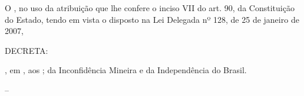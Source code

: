 \documentclass[a4paper,11pt]{report} %
\begin{document}


O \CargoSignatario, no uso da atribuição que lhe confere o inciso VII do art. 90, da Constituição do Estado, tendo em vista o disposto na Lei Delegada nº 128, de 25 de janeiro de 2007,

DECRETA:























\LocalAssinatura, em \CidadeAssinatura, aos \DataAssinatura; \AnivInconfidencia da Inconfidência Mineira e \AnivIndependencia da Independência do Brasil.

\Signatario – \CargoSignatario

\end{document}
